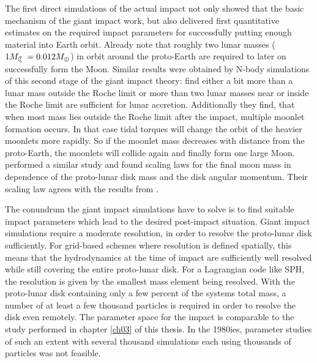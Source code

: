 The first direct simulations \citep{Benz:1985p1755, Benz:1989p1893, Cameron:2000p1854} of the actual impact not only showed that the basic mechanism of the giant impact work, but also delivered first quantitative estimates on the required impact parameters for successfully putting enough material into Earth orbit. Already \cite{1975Icar...24..504H} note that roughly two lunar masses ($1 \ML = 0.012 \ME$) in orbit around the proto-Earth are required to later on successfully form the Moon. Similar results were obtained by N-body simulations of this second stage of the giant impact theory: \cite{Canup:1996p3541} find either a bit more than a lunar mass outside the Roche limit or more than two lunar masses near or inside the Roche limit are sufficient for lunar accretion. Additionally they find, that when most mass lies outside the Roche limit after the impact, multiple moonlet formation occurs. In that case tidal torques will change the orbit of the heavier moonlets more rapidly. So if the moonlet mass decreases with distance from the proto-Earth, the moonlets will collide again and finally form one large Moon. \citep{Ida:1997p3395} performed a similar study and found scaling laws for the final moon mass in dependence of the proto-lunar disk mass and the disk angular momentum. Their scaling law agrees with the results from \cite{Canup:1996p3541}.

The conundrum the giant impact simulations have to solve is to find suitable impact parameters which lead to the desired post-impact situation. Giant impact simulations require a moderate resolution, in order to resolve the proto-lunar disk sufficiently. For grid-based schemes where resolution is defined spatially, this means that the hydrodynamics at the time of impact are sufficiently well resolved while still covering the entire proto-lunar disk. For a Lagrangian code like SPH, the resolution is given by the smallest mass element being resolved. With the proto-lunar disk containing only a few percent of the systems total mass, a number of at least a few thousand particles is required in order to resolve the disk even remotely. The parameter space for the impact is comparable to the study performed in chapter \ref{ch03} of this thesis. In the 1980ies, parameter studies of such an extent with several thousand simulations each using thousands of particles was not feasible.

